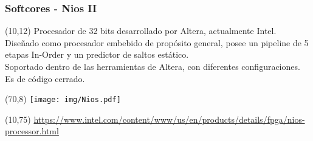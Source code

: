\documentclass[aspectratio=169]{beamer}
\begin{document}
\begin{frame}[t,fragile]
    \frametitle{Softcores - Nios II}
    \begin{textblock}{55}(10,12) \footnotesize
    Procesador de 32 bits desarrollado por Altera, actualmente Intel.\\
    \bigskip
    Diseñado como procesador embebido de propósito general, posee un pipeline de 5 etapas In-Order y un predictor de saltos estático.\\
    \bigskip
    Soportado dentro de las herramientas de Altera, con diferentes configuraciones.\\
    \bigskip
    Es de código cerrado.
    \end{textblock}
    \begin{textblock}{14}(70,8)
    \texttt{[image: img/Nios.pdf]}
    \end{textblock}
    \begin{textblock}{70}(10,75) \footnotesize
    \url{https://www.intel.com/content/www/us/en/products/details/fpga/nios-processor.html}
    \end{textblock}
\end{frame}
    
\end{document}
